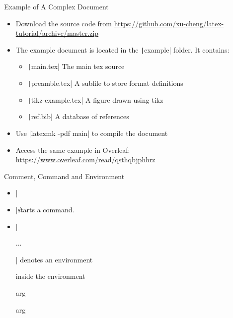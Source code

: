 \documentclass[xcolor={dvipsnames},aspectratio=169,10pt]{beamer}
\begin{document}
\begin{frame}[fragile]{Example of A Complex Document}
  \begin{itemize}
    \item Download the source code from \url{https://github.com/xu-cheng/latex-tutorial/archive/master.zip}
    \item The example document is located in the \texttt|example| folder. It contains:
          \begin{itemize}
            \item \texttt|main.tex| The main tex source
            \item \texttt|preamble.tex| A subfile to store format definitions
            \item \texttt|tikz-example.tex| A figure drawn using tikz
            \item \texttt|ref.bib| A database of references
          \end{itemize}
    \item Use \bashinline|latexmk -pdf main| to compile the document
    \item Access the same example in Overleaf: \url{https://www.overleaf.com/read/qsthqbjphhrz}
  \end{itemize}
\end{frame}

\begin{frame}[fragile]{Comment, Command and Environment}
  \begin{itemize}
    \item \latexinline|%
    \item \latexinline|\| starts a command.
          \begin{latexcode}
            \command %
            \command{} %
          \end{latexcode}
    \item \latexinline|\begin{} ... \end{}| denotes an environment
          \begin{latexcode}
            \begin{envname}
              inside the environment
            \end{envname}
            \begin{envname}{arg} \end{envname}
            \begin{envname}{arg} \end{envname}
          \end{latexcode}
  \end{itemize}
\end{frame}
\end{document}
